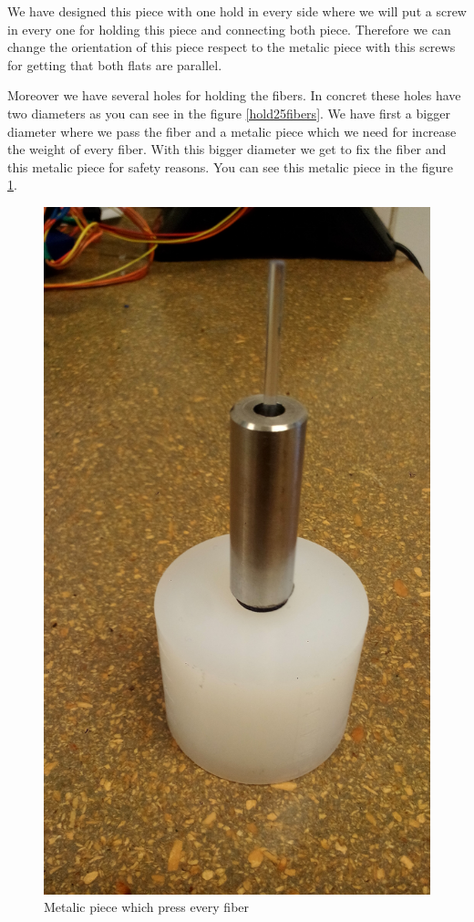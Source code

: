 \begin{itemize}
We have designed this piece with one hold in every side where we will put a screw in every one for holding this piece and connecting both piece. Therefore we can change the orientation of this piece respect to the metalic piece with this screws for getting that both flats are parallel.

Moreover we have several holes for holding the fibers. In concret these holes have two diameters as you can see in the figure \ref{hold25fibers}. We have first a bigger diameter where we pass the fiber and a metalic piece which we need for increase the weight of every fiber. With this bigger diameter we get to fix the fiber and this metalic piece for safety reasons. You can see this metalic piece in the figure \ref{metalicpiece}. 

\begin{figure}[hbtp]
\centering
\includegraphics[scale=0.05]{../Figures/piece.jpg}
\caption{Metalic piece which press every fiber\label{metalicpiece}}
\end{figure}


\end{itemize}
